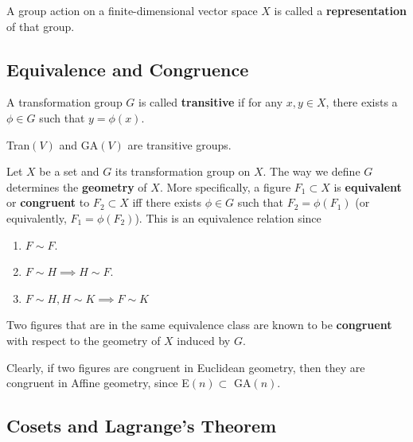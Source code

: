 \documentclass{article}
\begin{document}
    \begin{definition}
      A group action on a finite-dimensional vector space $X$ is called a \textbf{representation} of that group. 
    \end{definition}

  \subsection{Equivalence and Congruence}

    \begin{definition}
      A transformation group $G$ is called \textbf{transitive} if for any $x, y \in X$, there exists a $\phi \in G$ such that $y = \phi(x)$. 
    \end{definition}

    \begin{example}
      Tran$(V)$ and GA$(V)$ are transitive groups. 
    \end{example}

    \begin{definition}
      Let $X$ be a set and $G$ its transformation group on $X$. The way we define $G$ determines the \textbf{geometry} of $X$. More specifically, a figure $F_{1} \subset X$ is \textbf{equivalent} or \textbf{congruent} to $F_{2} \subset X$ iff there exists $\phi \in G$ such that $F_{2} = \phi (F_{1})$ (or equivalently, $F_{1} = \phi (F_{2})$). This is an equivalence relation since
      \begin{enumerate}
        \item $F \sim F$. 
        \item $F \sim H \implies H \sim F$. 
        \item $F \sim H, H \sim K \implies F \sim K$
      \end{enumerate}
      Two figures that are in the same equivalence class are known to be \textbf{congruent} with respect to the geometry of $X$ induced by $G$. 
    \end{definition}

    Clearly, if two figures are congruent in Euclidean geometry, then they are congruent in Affine geometry, since E$(n) \subset$ GA$(n)$. 

  \subsection{Cosets and Lagrange's Theorem}
\end{document}

